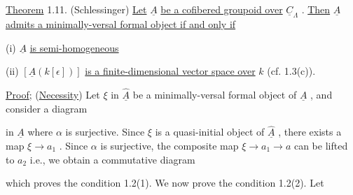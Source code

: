 \underline{Theorem} 1.11. (Schlessinger) \underline{Let} $\underline{A}$ \underline{be a cofibered groupoid over} $\underline{C}_{\Lambda}$ . \underline{Then} $\underline{A}$
\underline{admits a minimally-versal formal object if and only if}

  (i)  $\underline{A}$  \underline{is semi-homogeneous}

  (ii)  $[\underline{A}(k[\epsilon])]$  \underline{is a finite-dimensional vector space over}  $k$  (cf. 1.3(c)).

\underline{Proof}; (\underline{Necessity}) Let $\xi$ in $\hat{\underline{A}}$ be a minimally-versal formal object of $\underline{A}$ , and consider a diagram

\begin{center}
\end{center}
in $\underline{A}$ where $\alpha$ is surjective. Since $\xi$ is a quasi-initial object of $\hat{\underline{A}}$ , there exists a map $\xi \to a_1$ . Since $\alpha$ is surjective, the composite map $\xi \to a_1 \to a$ can be lifted to $a_2$ i.e., we obtain a commutative diagram

\begin{center}
\end{center}
which proves the condition 1.2(1). We now prove the condition 1.2(2). Let

